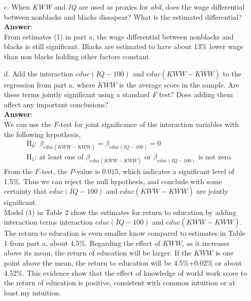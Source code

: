\documentclass[10pt]{article}
\begin{document}
\begin{enumerate}
\item[c.] When \textit{KWW} and \textit{IQ} are used as proxies for \textit{abil}, does the wage differential between nonblacks and blacks dissapear? What is the estimated differential?
\\ \textbf{Answer}:\\
From estimates (1) in part a, the wage differential between nonblacks and blacks is still significant. Blacks are estimated to have about 13\% lower wage than non blacks holding other factors constant.

\item[d.] Add the interaction $educ(IQ-100)$ and $educ(KWW-\overline{KWW})$ to the regression from part a, where $\overline{KWW}$ is the average score in the sample. Are these terms jointly significant using a standard \textit{F} test? Does adding them affect any important conclusions?
\\ \textbf{Answer}:\\
We can use the $F$-test for joint significance of the interaction variables with the following hypothesis,
\begin{align*}
    &\text{H}_0:\ \beta_{educ(KWW-\overline{KWW})}=\beta_{educ(IQ-100)}=0\\
    &\text{H}_1:\ \text{at least one of }\beta_{educ(KWW-\overline{KWW})}\text{ or }\beta_{educ(IQ-100)} \text{ is not zero}
\end{align*}
From the $F$-test, the $P$-value is $0.015$, which indicates a significant level of 1.5\%. Thus we can reject the null hypothesis, and conclude with some certainty that $educ(IQ-100)$ and $educ(KWW-\overline{KWW})$ are jointly significant.\\
Model (1) in Table 2 show the estimates for return to education by adding interaction terms interaction $educ(IQ-100)$ and $educ(KWW-\overline{KWW})$. The return to education is even smaller know compared to estimates in Table 1 from part a, about 4.5\%. Regarding the effect of $KWW$, as it increases above its mean, the return of education will be larger. If the $KWW$ is one point above the mean, the return to education will be 4.5\%+0.02\% or about 4.52\%. This evidence show that the effect of knowledge of world work score to the return of education is positive, consistent with common intuition or at least my intuition.

\end{enumerate}
\end{document}
